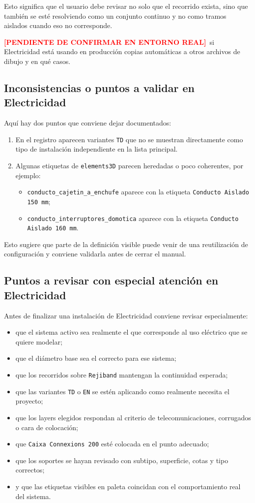 \documentclass[12pt,a4paper]{article}
\newcommand{\pendingtag}{\textcolor{red}{\textbf{[PENDIENTE DE CONFIRMAR EN ENTORNO REAL]}}}
\begin{document}
Esto significa que el usuario debe revisar no solo que el recorrido exista, sino que también se esté resolviendo como un conjunto continuo y no como tramos aislados cuando eso no corresponde.

\pendingtag\ si Electricidad está usando en producción copias automáticas a otros archivos de dibujo y en qué casos.

\subsection{Inconsistencias o puntos a validar en Electricidad}

Aquí hay dos puntos que conviene dejar documentados:

\begin{enumerate}
\item En el registro aparecen variantes \texttt{TD} que no se muestran directamente como tipo de instalación independiente en la lista principal.
\item Algunas etiquetas de \texttt{elements3D} parecen heredadas o poco coherentes, por ejemplo:
\begin{itemize}
\item \texttt{conducto\_cajetin\_a\_enchufe} aparece con la etiqueta \texttt{Conducto Aislado 150 mm};
\item \texttt{conducto\_interruptores\_domotica} aparece con la etiqueta \texttt{Conducto Aislado 160 mm}.
\end{itemize}
\end{enumerate}

Esto sugiere que parte de la definición visible puede venir de una reutilización de configuración y conviene validarla antes de cerrar el manual.

\subsection{Puntos a revisar con especial atención en Electricidad}

Antes de finalizar una instalación de Electricidad conviene revisar especialmente:

\begin{itemize}
\item que el sistema activo sea realmente el que corresponde al uso eléctrico que se quiere modelar;
\item que el diámetro base sea el correcto para ese sistema;
\item que los recorridos sobre \texttt{Rejiband} mantengan la continuidad esperada;
\item que las variantes \texttt{TD} o \texttt{EN} se estén aplicando como realmente necesita el proyecto;
\item que los layers elegidos respondan al criterio de telecomunicaciones, corrugados o cara de colocación;
\item que \texttt{Caixa Connexions 200} esté colocada en el punto adecuado;
\item que los soportes se hayan revisado con subtipo, superficie, cotas y tipo correctos;
\item y que las etiquetas visibles en paleta coincidan con el comportamiento real del sistema.
\end{itemize}
\end{document}
